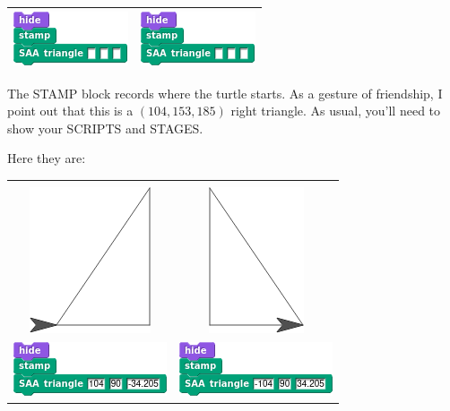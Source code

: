\documentclass[noauthor,nooutcomes,12pt,hints,handout]{ximera}
\begin{document}
\begin{question}
\begin{center}
\begin{tabular}{|c||c|}
      \includegraphics{SAAstampBlank.png} & \includegraphics{SAAstampBlank.png} \\\hline
    \end{tabular}
  \end{center}
  The STAMP block records where the turtle starts. As a gesture of
  friendship, I point out that this is a $(104, 153, 185)$ right
  triangle. As usual, you'll need to show your SCRIPTS and STAGES.
  \begin{freeResponse}
    Here they are:
    \begin{center}
    \begin{tabular}{|c||c|}\hline
      &  \\
      \includegraphics{stampStageII.png} & \includegraphics{stampStageI.png} \\
      \includegraphics{SAAstampScriptII.png} & \includegraphics{SAAstampScriptI.png} \\

\end{tabular}
\end{center}
\end{freeResponse}
\end{question}
\end{document}
